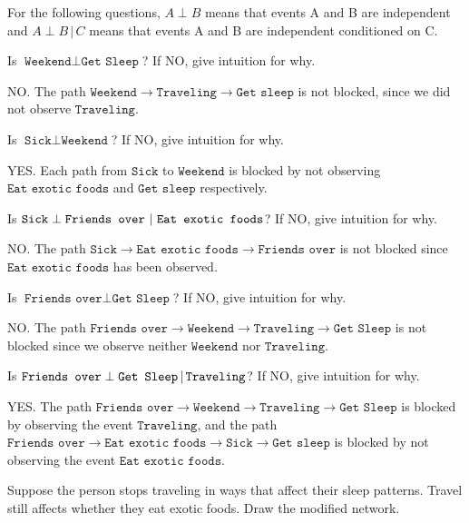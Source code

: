\documentclass[expanded]{lkx_pset}
\providecommand{\attr}[1]{\texttt{#1}}
\begin{document}
\begin{solution}
	For the following questions, $A \perp B$ means that events A and B are
	independent and $A \perp B \,|\, C$ means that events A and B are independent
	conditioned on C.

	\begin{part}{1}Is $\attr{Weekend} \perp \attr{Get Sleep}$?
		If NO, give intuition for why.
	\end{part}

	NO. The path $\attr{Weekend} \to \attr{Traveling} \to \attr{Get sleep}$ is not blocked, since we did not observe $\attr{Traveling}$.

	\begin{part}{2}Is $\attr{Sick} \perp \attr{Weekend}$?
		If NO, give intuition for why.
	\end{part}

	YES. Each path from $\attr{Sick}$ to $\attr{Weekend}$ is blocked by not observing $\attr{Eat exotic foods}$ and $\attr{Get sleep}$ respectively.

	\begin{part}{3}Is $\attr{Sick} \perp \attr{Friends over}\,\given\, \attr{Eat exotic
				foods}$? If NO, give intuition for why.
	\end{part}

	NO. The path $\attr{Sick} \to \attr{Eat exotic foods} \to \attr{Friends over}$ is not blocked since $\attr{Eat exotic foods}$ has been observed.

	\begin{part}{4}Is $\attr{Friends over} \perp \attr{Get Sleep}$? If NO, give
		intuition for why.
	\end{part}

	NO. The path $\attr{Friends over} \to \attr{Weekend} \to \attr{Traveling} \to \attr{Get Sleep}$ is not blocked since we observe neither $\attr{Weekend}$ nor $\attr{Traveling}$.

	\begin{part}{5} Is $\attr{Friends over} \perp \attr{Get Sleep} \given
			\attr{Traveling}$? If NO, give intuition for why.
	\end{part}

	YES. The path $\attr{Friends over} \to \attr{Weekend} \to \attr{Traveling} \to \attr{Get Sleep}$ is blocked by observing the event $\attr{Traveling}$, and the path $\attr{Friends over} \to \attr{Eat exotic foods} \to \attr{Sick} \to \attr{Get sleep}$ is blocked by not observing the event $\attr{Eat exotic foods}$.

	\begin{part}{6} Suppose the person stops traveling in ways that affect their
		sleep patterns.  Travel still
		affects whether they eat exotic foods.  Draw the modified network.
	\end{part}


\end{solution}
\end{document}

